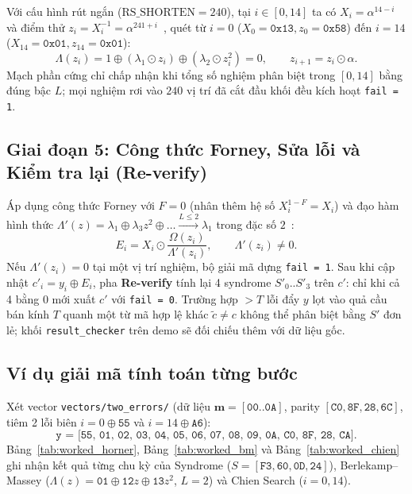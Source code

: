 \documentclass[11pt,a4paper]{report}
\begin{document}
Với cấu hình rút ngắn ($\text{RS\_SHORTEN} = 240$), tại $i \in [0, 14]$ ta có $X_i = \alpha^{14-i}$ và điểm thử $z_i = X_i^{-1} = \alpha^{241+i}$~\cite{chien1964}, quét từ $i = 0$ ($X_0 = \texttt{0x13}, z_0 = \texttt{0x58}$) đến $i = 14$ ($X_{14} = \texttt{0x01}, z_{14} = \texttt{0x01}$):
\begin{equation}
\Lambda(z_i) = 1 \oplus (\lambda_1 \odot z_i) \oplus (\lambda_2 \odot z_i^2) = 0, \qquad z_{i+1} = z_i \odot \alpha.
\label{eq:chien_mapping}
\end{equation}
Mạch phần cứng chỉ chấp nhận khi tổng số nghiệm phân biệt trong $[0, 14]$ bằng đúng bậc $L$; mọi nghiệm rơi vào $240$ vị trí đã cắt đầu khối đều kích hoạt \texttt{fail = 1}.

\subsection{Giai đoạn 5: Công thức Forney, Sửa lỗi và Kiểm tra lại (Re-verify)}

Áp dụng công thức Forney với $F = 0$ (nhân thêm hệ số $X_i^{1-F} = X_i$) và đạo hàm hình thức $\Lambda'(z) = \lambda_1 \oplus \lambda_3 z^2 \oplus \dots \xrightarrow{L \le 2} \lambda_1$ trong đặc số $2$~\cite{forney1965}:
\begin{equation}
E_i = X_i \odot \frac{\Omega(z_i)}{\Lambda'(z_i)}, \qquad \Lambda'(z_i) \neq 0.
\label{eq:forney_f0}
\end{equation}
Nếu $\Lambda'(z_i) = 0$ tại một vị trí nghiệm, bộ giải mã dựng \texttt{fail = 1}. Sau khi cập nhật $c'_i = y_i \oplus E_i$, pha \textbf{Re-verify} tính lại 4 syndrome $S'_0..S'_3$ trên $c'$: chỉ khi cả 4 bằng $0$ mới xuất $c'$ với \texttt{fail = 0}. Trường hợp $>T$ lỗi đẩy $y$ lọt vào quả cầu bán kính $T$ quanh một từ mã hợp lệ khác $\tilde{c} \neq c$ không thể phân biệt bằng $S'$ đơn lẻ; khối \texttt{result\_checker} trên demo sẽ đối chiếu thêm với dữ liệu gốc.

\subsection{Ví dụ giải mã tính toán từng bước}

Xét vector \texttt{vectors/two\_errors/} (dữ liệu $\mathbf{m} = [\texttt{00}..\texttt{0A}]$, parity $[\texttt{C0}, \texttt{8F}, \texttt{28}, \texttt{6C}]$, tiêm 2 lỗi biên $i=0 \oplus \texttt{55}$ và $i=14 \oplus \texttt{A6}$):
\[
\texttt{y = [55, 01, 02, 03, 04, 05, 06, 07, 08, 09, 0A, C0, 8F, 28, CA]}.
\]
Bảng~\ref{tab:worked_horner}, Bảng~\ref{tab:worked_bm} và Bảng~\ref{tab:worked_chien} ghi nhận kết quả từng chu kỳ của Syndrome ($S = [\texttt{F3}, \texttt{60}, \texttt{0D}, \texttt{24}]$), Berlekamp--Massey ($\Lambda(z) = \texttt{01} \oplus \texttt{12}z \oplus \texttt{13}z^2$, $L=2$) và Chien Search ($i=0, 14$).
\end{document}
